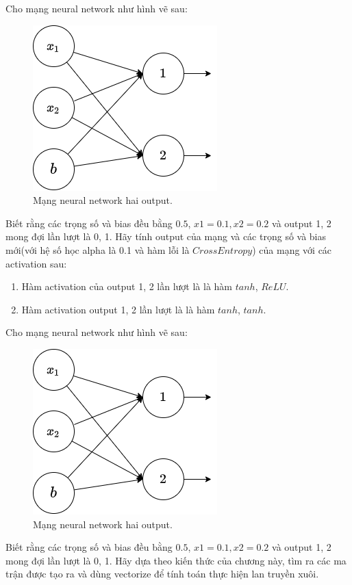 \clearpage
\begin{exer}
Cho mạng neural network như hình vẽ sau:
\begin{figure}[!h]
	\centering
		\includegraphics[width=0.5\columnwidth]{books/artificial-neural-network/chapter03/figure/bai2.png}
        \caption{Mạng neural network hai output.}
        \label{sec3:bai2}
		\centering
\end{figure}

Biết rằng các trọng số và bias đều bằng $0.5$, $x1=0.1, x2=0.2$ và output 1, 2 mong đợi lần lượt là 0, 1. Hãy tính output của mạng và các trọng số và bias mới(với hệ số học alpha là 0.1 và hàm lỗi là $CrossEntropy$) của mạng với các activation sau:
\begin{enumerate}
    \item Hàm activation của output 1, 2 lần lượt là là hàm $tanh$, $ReLU$.
    \item Hàm activation output 1, 2 lần lượt là là hàm $tanh$, $tanh$.
\end{enumerate}
\end{exer}

\clearpage
\begin{exer}
Cho mạng neural network như hình vẽ sau:
\begin{figure}[!h]
	\centering
		\includegraphics[width=0.5\columnwidth]{books/artificial-neural-network/chapter03/figure/bai2.png}
        \caption{Mạng neural network hai output.}
		\centering
\end{figure}

Biết rằng các trọng số và bias đều bằng $0.5$, $x1=0.1, x2=0.2$ và output 1, 2 mong đợi lần lượt là 0, 1. Hãy dựa theo kiến thức của chương này, tìm ra các ma trận được tạo ra và dùng vectorize để tính toán thực hiện lan truyền xuôi.
\end{exer}
